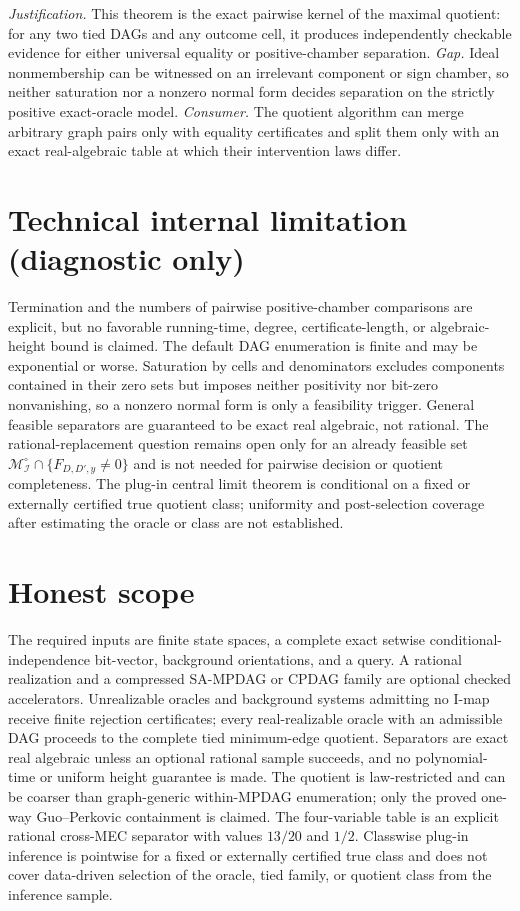 \documentclass{article}
\begin{document}
\par\smallskip\noindent \textit{Justification.} This theorem is the exact pairwise kernel of the maximal quotient: for any two tied DAGs and any outcome cell, it produces independently checkable evidence for either universal equality or positive-chamber separation. \textit{Gap.} Ideal nonmembership can be witnessed on an irrelevant component or sign chamber, so neither saturation nor a nonzero normal form decides separation on the strictly positive exact-oracle model. \textit{Consumer.} The quotient algorithm can merge arbitrary graph pairs only with equality certificates and split them only with an exact real-algebraic table at which their intervention laws differ.

\section*{Technical internal limitation (diagnostic only)}

Termination and the numbers of pairwise positive-chamber comparisons are explicit, but no favorable running-time, degree, certificate-length, or algebraic-height bound is claimed. The default DAG enumeration is finite and may be exponential or worse. Saturation by cells and denominators excludes components contained in their zero sets but imposes neither positivity nor bit-zero nonvanishing, so a nonzero normal form is only a feasibility trigger. General feasible separators are guaranteed to be exact real algebraic, not rational. The rational-replacement question remains open only for an already feasible set \(\mathcal M_{\mathcal I}^{\circ}\cap\{F_{D,D',y}\neq0\}\) and is not needed for pairwise decision or quotient completeness. The plug-in central limit theorem is conditional on a fixed or externally certified true quotient class; uniformity and post-selection coverage after estimating the oracle or class are not established.

\section{Honest scope}

The required inputs are finite state spaces, a complete exact setwise conditional-independence bit-vector, background orientations, and a query. A rational realization and a compressed SA-MPDAG or CPDAG family are optional checked accelerators. Unrealizable oracles and background systems admitting no I-map receive finite rejection certificates; every real-realizable oracle with an admissible DAG proceeds to the complete tied minimum-edge quotient. Separators are exact real algebraic unless an optional rational sample succeeds, and no polynomial-time or uniform height guarantee is made. The quotient is law-restricted and can be coarser than graph-generic within-MPDAG enumeration; only the proved one-way Guo--Perkovic containment is claimed. The four-variable table is an explicit rational cross-MEC separator with values \(13/20\) and \(1/2\). Classwise plug-in inference is pointwise for a fixed or externally certified true class and does not cover data-driven selection of the oracle, tied family, or quotient class from the inference sample.
\end{document}
